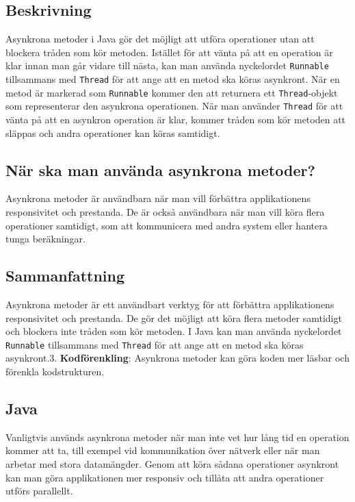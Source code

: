 \hypertarget{beskrivning}{%
\subsection{Beskrivning}\label{beskrivning}}

Asynkrona metoder i Java gör det möjligt att utföra operationer utan att
blockera tråden som kör metoden. Istället för att vänta på att en
operation är klar innan man går vidare till nästa, kan man använda
nyckelordet \texttt{Runnable} tillsammans med \texttt{Thread} för att
ange att en metod ska köras asynkront. När en metod är markerad som
\texttt{Runnable} kommer den att returnera ett \texttt{Thread}-objekt
som representerar den asynkrona operationen. När man använder
\texttt{Thread} för att vänta på att en asynkron operation är klar,
kommer tråden som kör metoden att släppas och andra operationer kan
köras samtidigt.

\hypertarget{nuxe4r-ska-man-anvuxe4nda-asynkrona-metoder}{%
\subsection{När ska man använda asynkrona
metoder?}\label{nuxe4r-ska-man-anvuxe4nda-asynkrona-metoder}}

Asynkrona metoder är användbara när man vill förbättra applikationens
responsivitet och prestanda. De är också användbara när man vill köra
flera operationer samtidigt, som att kommunicera med andra system eller
hantera tunga beräkningar.

\hypertarget{sammanfattning}{%
\subsection{Sammanfattning}\label{sammanfattning}}

Asynkrona metoder är ett användbart verktyg för att förbättra
applikationens responsivitet och prestanda. De gör det möjligt att köra
flera metoder samtidigt och blockera inte tråden som kör metoden. I Java
kan man använda nyckelordet \texttt{Runnable} tillsammans med
\texttt{Thread} för att ange att en metod ska köras asynkront.3.
\textbf{Kodförenkling}: Asynkrona metoder kan göra koden mer läsbar och
förenkla kodstrukturen.

\hypertarget{java}{%
\subsection{Java}\label{java}}

Vanligtvis används asynkrona metoder när man inte vet hur lång tid en
operation kommer att ta, till exempel vid kommunikation över nätverk
eller när man arbetar med stora datamängder. Genom att köra sådana
operationer asynkront kan man göra applikationen mer responsiv och
tillåta att andra operationer utförs parallellt.

